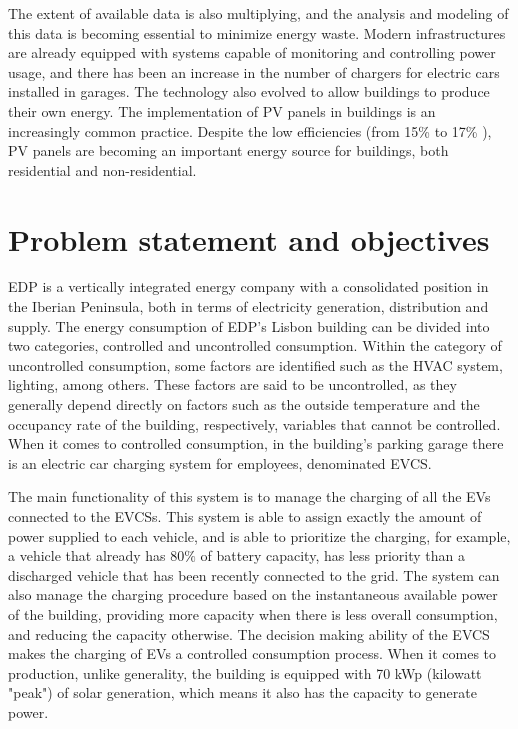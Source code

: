 The extent of available data is also multiplying, and the analysis and modeling of this data is becoming essential to minimize energy waste. Modern infrastructures are already equipped with systems capable of monitoring and controlling power usage, and there has been an increase in the number of chargers for electric cars installed in garages. The technology also evolved to allow buildings to produce their own energy. The implementation of \ac{PV} panels in buildings is an increasingly common practice. Despite the low efficiencies (from 15\% to 17\% \cite{pv}), \ac{PV} panels are becoming an important energy source for buildings, both  residential and non-residential. 









\section{Problem statement and objectives}


\ac{EDP} is a vertically integrated energy company with a consolidated position in the Iberian Peninsula, both in terms of electricity generation, distribution and supply. The energy consumption of \ac{EDP}'s Lisbon building can be divided into two categories, controlled and uncontrolled consumption. Within the category of uncontrolled consumption, some factors are identified such as the \ac{HVAC} system, lighting, among others. These factors are said to be uncontrolled, as they generally depend directly on factors such as the outside temperature and the occupancy rate of the building, respectively, variables that cannot be controlled. When it comes to controlled consumption, in the building's parking garage there is an electric car charging system for employees, denominated \ac{EVCS}. 

The main functionality of this system is to manage the charging of all the \ac{EV}s connected to the \ac{EVCSs}. This system is able to assign exactly the amount of power supplied to each vehicle, and is able to prioritize the charging, for example, a vehicle that already has 80$\%$ of battery capacity, has less priority than a discharged vehicle that has been recently connected to the grid. The system can also manage the charging procedure based on the instantaneous available power of the building, providing more capacity when there is less overall consumption, and reducing the capacity otherwise. The decision making ability of the \ac{EVCS} makes the charging of \ac{EV}s a controlled consumption process. When it comes to production, unlike generality, the building is equipped with 70 kWp (kilowatt "peak") of solar generation, which means it also has the capacity to generate power. 



